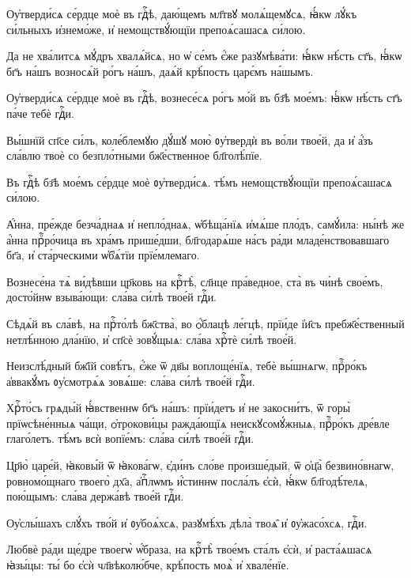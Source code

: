 \hKv Оу҆тверди́сѧ се́рдце моѐ въ гдⷭ҇ѣ, даю́щемъ мл҃твꙋ  молѧ́щемꙋсѧ, ꙗ҆́кѡ лꙋ́къ си́льныхъ и҆знемо́же, и҆  немощствꙋ́ющїи препоѧ́сашасѧ си́лою. 

\hKv Да не хва́литсѧ мꙋ́дръ хвалѧ́йсѧ, но ѡ҆ се́мъ є҆́же  разꙋмѣва́ти: ꙗ҆́кѡ нѣ́сть ст҃ъ, ꙗ҆́кѡ бг҃ъ на́шъ  возносѧ́й ро́гъ на́шъ, даѧ́й крѣ́пость царє́мъ на́шымъ. 

\hKv Оу҆тверди́сѧ се́рдце моѐ въ гдⷭ҇ѣ, вознесе́сѧ ро́гъ мо́й  въ бз҃ѣ мое́мъ: ꙗ҆́кѡ нѣ́сть ст҃ъ па́че тебѐ гдⷭ҇и. 

\hKv Вы́шнїй сп҃се си́лъ, коле́блемꙋю дꙋ́шꙋ мою̀ ᲂу҆твердѝ въ  во́ли твое́й, да и҆ а҆́зъ сла́влю твоѐ со безпло́тными  бж҃е́ственное бл҃голѣ́пїе. 

\hKv Въ гдⷭ҇ѣ бз҃ѣ мое́мъ се́рдце моѐ ᲂу҆тверди́сѧ. тѣ́мъ  немощствꙋ́ющїи препоѧ́сашасѧ си́лою. 

\hKv А҆́нна, пре́жде безча́днаѧ и҆ непло́днаѧ, ѡ҆бѣща́нїѧ  и҆мѧ́ше пло́дъ, самꙋ́ила: ны́нѣ же а҆́нна прⷪ҇ро́чица въ  хра́мъ прише́дши, бл҃годарѧ́ше   на́съ ра́ди младе́нствовавшаго бг҃а, и҆ ста́рческими  ѡ҆б̾ѧ́тїи прїе́млемаго. 
%

\hKv Вознесе́на тѧ̀ ви́дѣвши цр҃ковь на крⷭ҇тѣ̀, сл҃нце  пра́ведное, ста̀ въ чи́нѣ свое́мъ, досто́йнѡ взыва́ющи:  сла́ва си́лѣ твое́й гдⷭ҇и. 
%

\hKv Сѣдѧ́й въ сла́вѣ, на прⷭ҇то́лѣ  бж҃ства̀, во ѻ҆́блацѣ ле́гцѣ, прїи́де і҆и҃съ  пребж҃е́ственный нетлѣ́нною дла́нїю, и҆ сп҃сѐ зовꙋ́щыѧ:  сла́ва хрⷭ҇тѐ си́лѣ твое́й. 
%

\hKv Неизслѣ́дный бж҃їй совѣ́тъ, є҆́же ѿ дв҃ы воплоще́нїѧ,  тебѐ вы́шнѧгѡ, прⷪ҇ро́къ а҆ввакꙋ́мъ ᲂу҆смотрѧ́ѧ зовѧ́ше:  сла́ва си́лѣ твое́й гдⷭ҇и. 
%

\hKv Хрⷭ҇то́съ грѧды́й ꙗ҆́вственнѡ бг҃ъ  на́шъ: прїи́детъ и҆ не закосни́тъ, ѿ горы̀ прїѡсѣне́нныѧ  ча́щи, ѻ҆трокови́цы ражда́ющїѧ неискꙋсомꙋ́жныѧ, прⷪ҇ро́къ  дре́вле  глаго́летъ. тѣ́мъ  всѝ вопїе́мъ: сла́ва си́лѣ твое́й гдⷭ҇и. 
%

\hKv Цр҃ю̀ царе́й, ꙗ҆ковы́й ѿ ꙗ҆кова́гѡ,  є҆ди́нъ сло́ве произше́дый, ѿ ѻ҆ц҃а̀ безвино́внагѡ,  ровномо́щнаго твоего̀ дх҃а, а҆пⷭ҇лѡмъ и҆́стиннѡ посла́лъ  є҆сѝ, ꙗ҆́кѡ бл҃годѣ́телѧ, пою́щымъ: сла́ва держа́вѣ  твое́й гдⷭ҇и. 
%

\hKv Оу҆слы́шахъ слꙋ́хъ тво́й и҆ ᲂу҆боѧ́хсѧ, разꙋмѣ́хъ дѣла̀  твоѧ̑ и҆ ᲂу҆жасо́хсѧ, гдⷭ҇и. 

\hKv Любвѐ ра́ди ще́дре твоегѡ̀ ѡ҆́браза, на крⷭ҇тѣ̀ твое́мъ  ста́лъ є҆сѝ, и҆ раста́ѧшасѧ ꙗ҆зы́цы: ты́ бо є҆сѝ  чл҃вѣколю́бче, крѣ́пость моѧ̀ и҆ хвале́нїе. 

